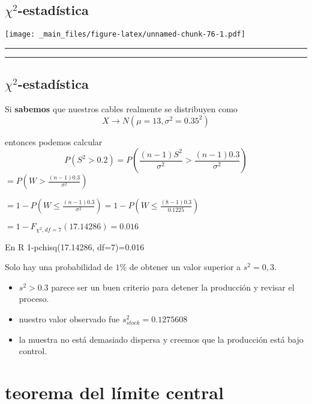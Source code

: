 \documentclass[
]{book}
\begin{document}
\hypertarget{chi2-estaduxedstica}{%
\section{\texorpdfstring{\(\chi^2\)-estadística}{\textbackslash chi\^{}2-estadística}}\label{chi2-estaduxedstica}}

\texttt{[image: \_main\_files/figure-latex/unnamed-chunk-76-1.pdf]}

\begin{center}\rule{0.5\linewidth}{0.5pt}\end{center}

\begin{center}\rule{0.5\linewidth}{0.5pt}\end{center}

\hypertarget{chi2-estaduxedstica-1}{%
\section{\texorpdfstring{\(\chi^2\)-estadística}{\textbackslash chi\^{}2-estadística}}\label{chi2-estaduxedstica-1}}

Si \textbf{sabemos} que nuestros cables realmente se distribuyen como \[X \rightarrow N(\mu=13, \sigma^2=0.35^2)\]

entonces podemos calcular \[P(S^2 > 0.2)=P(\frac{(n-1)S^2}{\sigma^2} > \frac{(n-1)0.3}{\sigma^ 2})\]
\(=P(W > \frac{(n-1)0.3}{\sigma^2})\)

\(=1-P(W \leq \frac{(n-1)0.3}{\sigma^2})=1-P(W\leq \frac{(8-1)0.3}{0.1225})\)

\(= 1- F_{\chi^2,df=7}(17.14286)=0.016\)

En R
1-pchisq(17.14286, df=7)=0.016

Solo hay una probabilidad de \(1\%\) de obtener un valor superior a \(s^2=0,3\).

\begin{itemize}
\item
  \(s^2>0.3\) parece ser un buen criterio para detener la producción y revisar el proceso.
\item
  nuestro valor observado fue \(s^2_{stock}=0.1275608\)
\item
  la muestra no está demasiado dispersa y creemos que la producción está bajo control.
\end{itemize}

\hypertarget{teorema-del-luxedmite-central}{%
\chapter{teorema del límite central}\label{teorema-del-luxedmite-central}}
\end{document}

